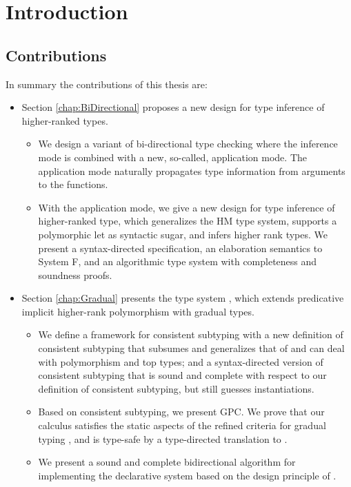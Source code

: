 \chapter{Introduction}


\section{Contributions}

In summary the contributions of this thesis are:

\begin{itemize}

\item Section \ref{chap:BiDirectional} proposes a new design for type inference of higher-ranked types.
  \begin{itemize}
  \item We design a variant of bi-directional type checking
    where the inference mode is combined with a new, so-called, application
    mode. The application mode naturally propagates type information from
    arguments to the functions.
  \item With the application mode, we give a new design for type inference of
    higher-ranked type, which generalizes the HM type system, supports a
    polymorphic let as syntactic sugar, and infers higher rank types. We present
    a syntax-directed specification, an elaboration semantics to System F, and
    an algorithmic type system with completeness and soundness proofs.
  \end{itemize}

\item Section \ref{chap:Gradual} presents the type system \gpc, which extends predicative implicit
  higher-rank polymorphism with gradual types.
  \begin{itemize}
  \item We define a framework for consistent subtyping with a new definition of
    consistent subtyping that subsumes and generalizes that of
    \cite{siek:consistent:subtyping} and can deal with polymorphism and top
    types; and a syntax-directed version of consistent subtyping that is sound
    and complete with respect to our definition of consistent subtyping, but
    still guesses instantiations.
  \item Based on consistent subtyping, we present GPC. We prove that our
    calculus satisfies the static aspects of the refined criteria for gradual
    typing \cite{siek:criteria}, and is type-safe by
    a type-directed translation to \pbc \cite{amal:blame}.
  \item We present a sound and complete
    bidirectional algorithm for implementing the declarative system based on
    the design principle of \cite{garcia:principal}.
  \end{itemize}
  

\end{itemize}
